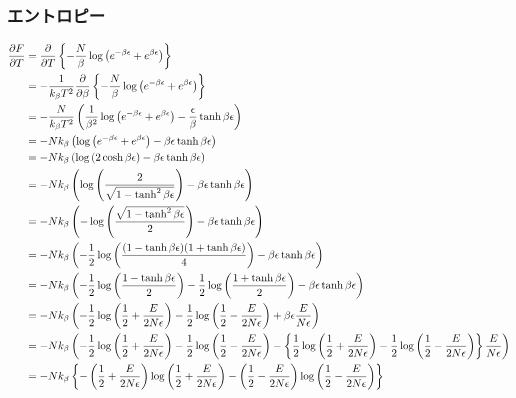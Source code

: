 \documentclass{jsarticle}  %
\numberwithin{equation}{section} %
\numberwithin{figure}{section}
\begin{document}
\subsubsection{エントロピー}
    \begin{align}
        \frac{\partial F}{\partial T} &= \frac{\partial}{\partial T} \left\{ -\frac{N}{\beta} \log \left( e^{-\beta \epsilon} + e^{\beta \epsilon} \right)  \right\} \notag \\
        &= -\frac{1}{k_\beta T^2} \frac{\partial }{\partial \beta} \left\{ -\frac{N}{\beta} \log \left( e^{-\beta \epsilon} + e^{\beta \epsilon} \right)  \right\} \notag \\
        &= -\frac{N}{k_\beta T^2} \left( \frac{1}{\beta^2}  \log \left( e^{-\beta \epsilon} + e^{\beta \epsilon} \right) - \frac{\epsilon}{\beta} \tanh \beta \epsilon \right) \notag \\
        &= -Nk_\beta \left( \log \left( e^{-\beta \epsilon} + e^{\beta \epsilon} \right) - \beta \epsilon \tanh \beta \epsilon \right) \notag \\
        &= -Nk_\beta \left( \log \left( 2\cosh \beta \epsilon \right) - \beta \epsilon \tanh \beta \epsilon \right) \\
        &= -Nk_\beta \left( \log \left( \frac{2}{\sqrt{1 - \tanh^2 \beta \epsilon }} \right) - \beta \epsilon \tanh \beta \epsilon \right) \notag \\
        &= -Nk_\beta \left( -\log \left( \frac{\sqrt{1 - \tanh^2 \beta \epsilon }}{2} \right) - \beta \epsilon \tanh \beta \epsilon \right) \notag \\
        &= -Nk_\beta \left( -\frac{1}{2}\log \left( \frac{(1 - \tanh \beta \epsilon)(1 + \tanh \beta \epsilon) }{4} \right) - \beta \epsilon \tanh \beta \epsilon \right) \notag \\
        &= -Nk_\beta \left( -\frac{1}{2}\log \left( \frac{1 - \tanh \beta \epsilon}{2} \right) -\frac{1}{2}\log \left( \frac{1 + \tanh \beta \epsilon }{2} \right) - \beta \epsilon \tanh \beta \epsilon \right) \notag \\
        &= -Nk_\beta \left( -\frac{1}{2}\log \left( \frac{1}{2} + \frac{E}{2N\epsilon} \right) -\frac{1}{2}\log \left( \frac{1}{2} - \frac{E}{2N\epsilon} \right) + \beta \epsilon \frac{E}{N\epsilon} \right) \notag \\
        &= -Nk_\beta \left( -\frac{1}{2}\log \left( \frac{1}{2} + \frac{E}{2N\epsilon} \right) -\frac{1}{2}\log \left( \frac{1}{2} - \frac{E}{2N\epsilon} \right) - \left\{ \frac{1}{2} \log \left( \frac{1}{2} + \frac{E}{2N\epsilon} \right) - \frac{1}{2} \log \left( \frac{1}{2} - \frac{E}{2N\epsilon} \right) \right\} \frac{E}{N\epsilon} \right) \notag \\
        &= -Nk_\beta \left\{ -\left( \frac{1}{2} + \frac{E}{2N\epsilon} \right) \log \left( \frac{1}{2} + \frac{E}{2N\epsilon} \right) - \left( \frac{1}{2} - \frac{E}{2N\epsilon} \right) \log \left( \frac{1}{2} - \frac{E}{2N\epsilon} \right) \right\} 
    \end{align}
\end{document}
